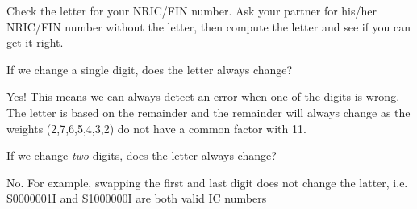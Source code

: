 \documentclass[a4paper,12pt]{article}
\begin{document}
\begin{question}[skip-below=3\baselineskip,name=Advance exercise]
Check the letter for your NRIC/FIN number. Ask your partner for
his/her NRIC/FIN number without the letter, then compute
the letter and see if you can get it right.
\end{question}

\begin{question}[skip-below=3\baselineskip,name=Advance exercise]
If we change a single digit, does the letter always change?
\end{question}

\begin{solution}
Yes! This means we can always detect an error when one of the digits is wrong.
The letter is based on the remainder and the remainder will always change as the
weights (2,7,6,5,4,3,2) do not have a common factor with 11.
\end{solution}

\begin{question}[skip-below=3\baselineskip,name=Advance exercise]
If we change \emph{two} digits, does the letter always change?
\end{question}

\begin{solution}
No. For example, swapping the first and last digit does not change the latter,
i.e. S0000001I and S1000000I are both valid IC numbers
\end{solution}
\end{document}
